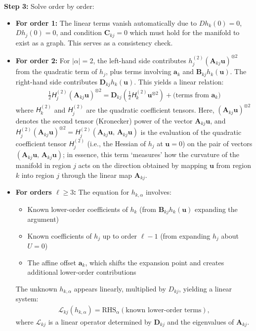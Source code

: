 \documentclass{article}
\theoremstyle{example}
\theoremstyle{plain}
\theoremstyle{definition}
\theoremstyle{remark}
\def\mA{{\bm{A}}}
\def\mB{{\bm{B}}}
\def\mC{{\bm{C}}}
\def\mD{{\bm{D}}}
\newcommand{\tens}[1]{\bm{\mathsfit{#1}}}
\def\tH{{\tens{H}}}
\begin{document}
\textbf{Step 3:} Solve order by order:
\begin{itemize}
\item \textbf{For order 1:} The linear terms vanish automatically due to $Dh_k(0)=0$, $Dh_j(0)=0$, and condition $\mC_{kj}=0$ which must hold for the manifold to exist as a graph. This serves as a consistency check.
\item \textbf{For order 2:} For $|\alpha|=2$, the left-hand side contributes $h_j^{(2)}(\mA_{kj}\bm{u})^{\otimes 2}$ from the quadratic term of $h_j$, plus terms involving $\bm{a}_k$ and $\mB_{kj}h_k(\bm{u})$. The right-hand side contributes $\mD_{kj}h_k(\bm{u})$. This yields a linear relation:
\begin{align}
\frac{1}{2} \tH_j^{(2)} (\mA_{kj} \bm{u})^{\otimes 2} = \mD_{kj} \left( \frac{1}{2} \tH_k^{(2)} \bm{u}^{\otimes 2} \right) + \text{(terms from } \bm{a}_k \text{)}
\end{align}
where $\tH_k^{(2)}$ and $\tH_j^{(2)}$ are the quadratic coefficient tensors. 
%
Here, $(\mA_{kj}\bm{u})^{\otimes 2}$ denotes the second tensor (Kronecker) power of the vector $\mA_{kj}\bm{u}$, and $ \tH_j^{(2)} (\mA_{kj}\bm{u})^{\otimes 2} = \tH_j^{(2)}(\mA_{kj}\bm{u},\,\mA_{kj}\bm{u})$ is the evaluation of the quadratic coefficient tensor $\tH_j^{(2)}$ (i.e., the Hessian of $h_j$ at $\bm{u}=0$) on the pair of vectors $(\mA_{kj}\bm{u},\,\mA_{kj}\bm{u})$; in essence, this term `measures' how the curvature of the manifold in region $j$ acts on the direction obtained by mapping $\bm{u}$ from region $k$ into region $j$ through the linear map $\mA_{kj}$.
%
\item \textbf{For orders $\ell \ge 3$:} The equation for $h_{k,\alpha}$ involves:
\begin{itemize}
\item Known lower-order coefficients of $h_k$ (from $\mB_{kj}h_k(\bm{u})$ expanding the argument)
\item Known coefficients of $h_j$ up to order $\ell-1$ (from expanding $h_j$ about $U=0$)
\item The affine offset $\bm{a}_k$, which shifts the expansion point and creates additional lower-order contributions
\end{itemize}
The unknown $h_{k,\alpha}$ appears linearly, multiplied by $D_{kj}$, yielding a linear system:
\begin{align}
\mathcal{L}_{kj}(h_{k,\alpha}) = \text{RHS}_{\alpha}(\text{known lower-order terms}),
\end{align}
where $\mathcal{L}_{kj}$ is a linear operator determined by $\mD_{kj}$ and the eigenvalues of $\mA_{kj}$.
\end{itemize}
\end{document}
